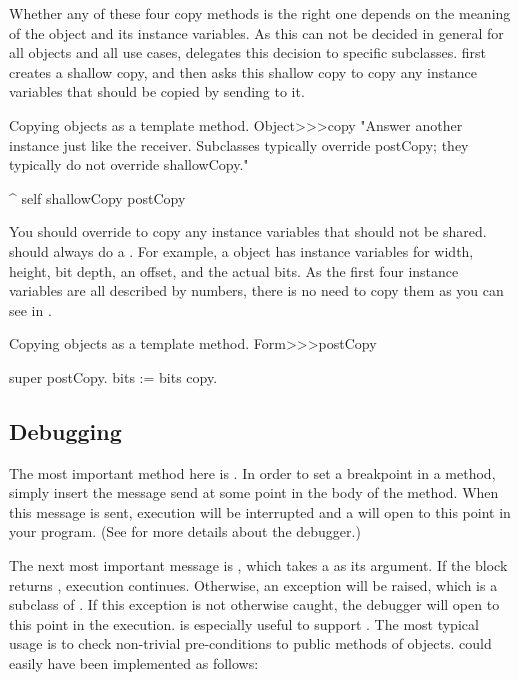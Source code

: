\documentclass[a4paper,10pt,twoside]{book}
\begin{document}
Whether any of these four copy methods is the right one depends on the meaning of the object and its instance variables.
As this can not be decided in general for all objects and all use cases,  delegates this decision to specific subclasses.
 first creates a shallow copy, and then asks this shallow copy to copy any instance variables that should be copied by sending  to it.

\begin{method}{Copying objects as a template method.}
Object>>>copy
    "Answer another instance just like the receiver. Subclasses typically override postCopy; they typically do not override shallowCopy."

    ^ self shallowCopy postCopy
\end{method}

You should override  to copy any instance variables that should not be shared.
 should always do a .
For example, a  object has instance variables for width, height, bit depth, an offset, and the actual bits.
As the first four instance variables are all described by numbers, there is no need to copy them as you can see in .

\begin{method}{Copying objects as a template method.}
Form>>>postCopy

	super postCopy.
    bits := bits copy.
\end{method}



\subsection{Debugging}

The most important method here is .
In order to set a breakpoint in a method, simply insert the message send  at some point in the body of the method.
When this message is sent, execution will be interrupted and a  will open to this point in your program.
(See  for more details about the debugger.)


The next most important message is , which takes a  as its argument.
If the block returns , execution continues.
Otherwise, an  exception will be raised, which is a subclass of .
If this exception is not otherwise caught, the debugger will open to this point in the execution.
 is especially useful to support .
The most typical usage is to check non-trivial pre-conditions to public methods of objects.
 could easily have been implemented as follows:
\end{document}
